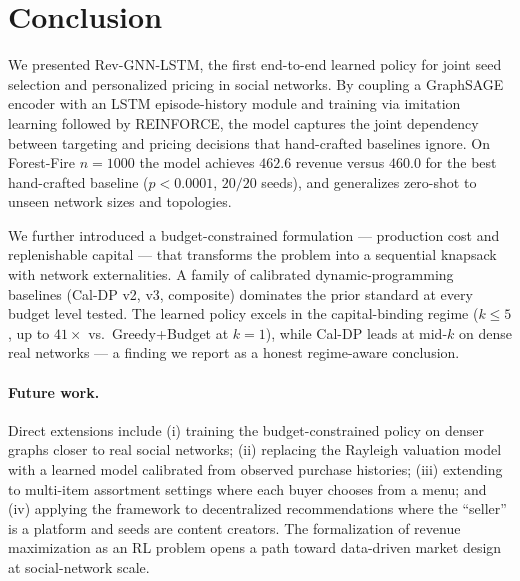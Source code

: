 
\section{Conclusion}
\label{sec:conclusion}

We presented Rev-GNN-LSTM, the first end-to-end learned policy for joint seed
selection and personalized pricing in social networks.
By coupling a GraphSAGE encoder with an LSTM episode-history module and training
via imitation learning followed by REINFORCE, the model captures the joint
dependency between targeting and pricing decisions that hand-crafted baselines
ignore.
On Forest-Fire $n{=}1000$ the model achieves $462.6$ revenue versus $460.0$
for the best hand-crafted baseline ($p{<}0.0001$, $20/20$ seeds), %
and generalizes zero-shot to unseen network sizes and topologies.

We further introduced a budget-constrained formulation — production cost and
replenishable capital — that transforms the problem into a sequential knapsack
with network externalities.
A family of calibrated dynamic-programming baselines (Cal-DP v2, v3, composite)
dominates the prior standard at every budget level tested.
The learned policy excels in the capital-binding regime ($k \le 5$, up to $41\times$
vs.\ Greedy+Budget at $k{=}1$), while Cal-DP leads at mid-$k$ on dense real
networks — a finding we report as a honest regime-aware conclusion.

\paragraph{Future work.}
Direct extensions include (i) training the budget-constrained policy on denser
graphs closer to real social networks; (ii) replacing the Rayleigh valuation model
with a learned model calibrated from observed purchase histories;
(iii) extending to multi-item assortment settings where each buyer chooses from
a menu; and (iv) applying the framework to decentralized recommendations where
the ``seller'' is a platform and seeds are content creators.
The formalization of revenue maximization as an RL problem opens a path toward
data-driven market design at social-network scale.
